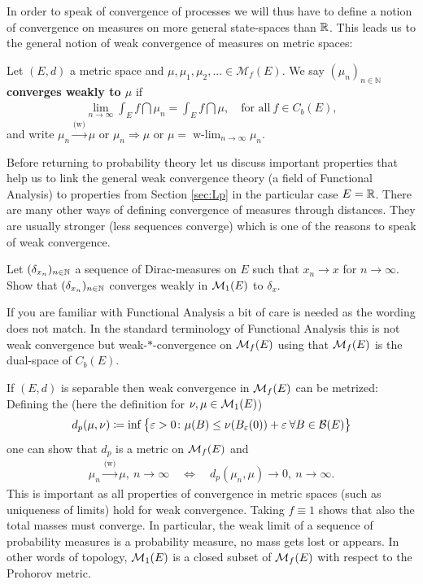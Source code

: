 In order to speak of convergence of processes we will thus have to define a notion of convergence on measures on more general state-spaces than $\mathbb{R}$. This leads us to the general notion of weak convergence of measures on metric spaces:
\begin{ldef}
\begin{deff}
	Let $(E,d)$ a metric space and $\mu,\mu_1,\mu_2,...\in \mathcal M_f(E)$. We say \textbf{$(\mu_n)_{n\in\mathbb{N}}$ converges weakly to $\mu$} if
	\begin{align*}
		\lim_{n\to\infty} \int_E f\dint \mu_n = \int_E f \dint \mu, \quad \text{for all}\: f \in C_b(E),
	\end{align*}
	and write $\mu_n \overset{\text{(w)}}{\longrightarrow}\mu$ or $\mu_n\Rightarrow \mu$ or $\mu = \operatorname{w-\lim\limits}_{n\to\infty}\mu_n$.
\end{deff}
\end{ldef}
Before returning to probability theory let us discuss important properties that help us to link the general weak convergence theory (a field of Functional Analysis) to properties from Section \ref{sec:Lp} in the particular case $E=\mathbb{R}$. 	There are many other ways of defining convergence of measures through distances. They are usually stronger (less sequences converge) which is one of the reasons to speak of weak convergence.
\begin{luebung}
	Let $(\delta_{x_n})_{n\in\mathbb{N}}$ a sequence of Dirac-measures on $E$ such that $x_n\to x$ for $n\to\infty$. Show that $(\delta_{x_n})_{n\in\mathbb{N}}$ converges weakly in $\mathcal{M}_1(E)$ to $\delta_x$.
\end{luebung}
If you are familiar with Functional Analysis a bit of care is needed as the wording does not match. In the standard terminology of Functional Analysis this is not weak convergence but weak-$*$-convergence on $\mathcal{M}_f(E)$ using that $\mathcal{M}_f(E)$ is the dual-space of $C_b(E)$.
\begin{prop}
			If $(E,d)$ is separable then weak convergence in $\mathcal{M}_f(E)$ can be metrized: 
			Defining the \textbf{} (here the definition for $\nu,\mu\in \mathcal{M}_1(E)$)
			\begin{align*}
				d_p(\mu,\nu) \coloneqq \inf \big\{ \varepsilon >0 \colon \mu (B) \leq \nu (B_{\varepsilon}(0)) + \varepsilon \:\forall B\in \mathcal{B}(E) \big\}
			\end{align*}
			one can show that $d_p$ is a metric on $\mathcal{M}_f(E)$ and
			\begin{align*}
				\mu_n \overset{\text{(w)}}{\longrightarrow}\mu, \: n \to \infty \quad\Leftrightarrow \quad d_p(\mu_n,\mu) \to 0, \: n\to \infty.
			\end{align*}
			This is important as all properties of convergence in  metric spaces (such as uniqueness of limits) hold for weak convergence. Taking $f \equiv 1$ shows that also the total masses must converge. In particular, the weak limit of a sequence of probability measures is a probability measure, no mass gets lost or appears. In other words of topology, $\mathcal{M}_1(E)$ is a closed subset of $\mathcal{M}_f(E)$ with respect to the Prohorov metric.
\end{prop}
